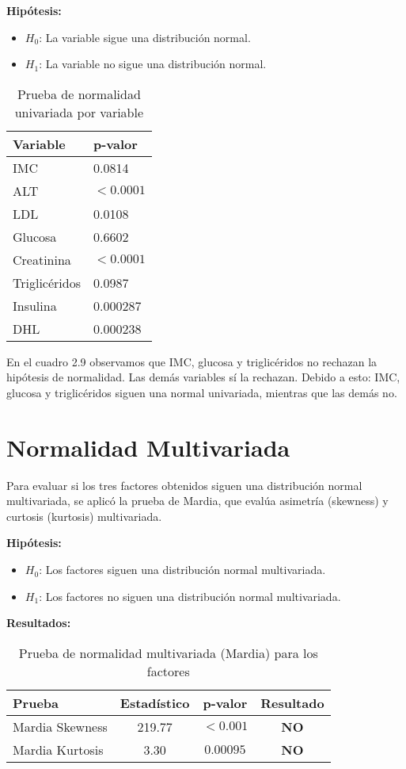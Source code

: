 \documentclass[12pt]{report}
\begin{document}
\textbf{Hipótesis:}
\begin{itemize}
    \item $H_0$: La variable sigue una distribución normal.
    \item $H_1$: La variable no sigue una distribución normal.
\end{itemize}

\begin{table}[H]
\centering
\begin{tabular}{ll}
\toprule
\textbf{Variable} & \textbf{p-valor} \\
\midrule
IMC & 0.0814 \\
ALT & $< 0.0001$ \\
LDL & 0.0108 \\
Glucosa & 0.6602 \\
Creatinina & $< 0.0001$ \\
Triglicéridos & 0.0987 \\
Insulina & 0.000287 \\
DHL & 0.000238 \\
\bottomrule
\end{tabular}
\caption{Prueba de normalidad univariada por variable}
\end{table}

\noindent En el cuadro 2.9 observamos que IMC, glucosa y triglicéridos no rechazan la hipótesis de normalidad. Las demás variables sí la rechazan. Debido a esto: IMC, glucosa y triglicéridos siguen una normal univariada, mientras que las demás no.
\newpage
\section{Normalidad Multivariada}
Para evaluar si los tres factores obtenidos siguen una distribución normal multivariada, se aplicó la prueba de Mardia, que evalúa asimetría (skewness) y curtosis (kurtosis) multivariada.

\textbf{Hipótesis:}
\begin{itemize}
    \item $H_0$: Los factores siguen una distribución normal multivariada.
    \item $H_1$: Los factores no siguen una distribución normal multivariada.
\end{itemize}

\textbf{Resultados:}
\begin{table}[H]
\centering
\begin{tabular}{|l|c|c|c|}
\hline
\textbf{Prueba} & \textbf{Estadístico} & \textbf{p-valor} & \textbf{Resultado} \\
\hline
Mardia Skewness & 219.77 & $< 0.001$ & \textbf{NO} \\
Mardia Kurtosis & 3.30 & $0.00095$ & \textbf{NO}\\
\hline
\end{tabular}
\caption{Prueba de normalidad multivariada (Mardia) para los factores}
\end{table}
\end{document}
